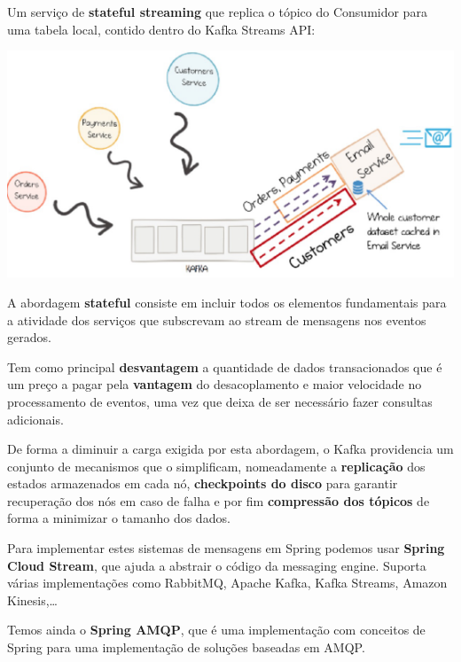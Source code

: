 \documentclass{article}
\begin{document}
Um serviço de \textbf{stateful streaming} que replica
o tópico do Consumidor para uma tabela local,
contido dentro do Kafka Streams API:

\begin{center}
  \includegraphics[scale=0.6]{114}
\end{center}

A abordagem \textbf{stateful} consiste em incluir todos os elementos fundamentais para a atividade dos
serviços que subscrevam ao stream de mensagens nos eventos gerados.

\vspace{2mm}

Tem como principal \textbf{desvantagem} a quantidade de dados transacionados que é um preço a
pagar pela \textbf{vantagem} do desacoplamento e maior velocidade no processamento de eventos,
uma vez que deixa de ser necessário fazer consultas adicionais.

\vspace{2mm}

De forma a diminuir a carga exigida por esta abordagem, o Kafka providencia um conjunto de
mecanismos que o simplificam, nomeadamente a \textbf{replicação} dos estados armazenados em
cada nó, \textbf{checkpoints do disco} para garantir recuperação dos nós em caso de falha e por fim
\textbf{compressão dos tópicos} de forma a minimizar o tamanho dos dados.

\vspace{2mm}

Para implementar estes sistemas de mensagens em Spring podemos usar
\textbf{Spring Cloud Stream}, que ajuda a abstrair o código
da messaging engine. Suporta várias implementações
como RabbitMQ, Apache Kafka, Kafka Streams, Amazon Kinesis,\dots

\vspace{2mm}

Temos ainda o \textbf{Spring AMQP}, que é uma implementação
com conceitos de Spring para uma implementação de
soluções baseadas em AMQP.
\end{document}

